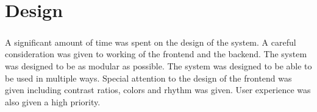 \chapter{Design}

    \paragraph*{}
        A significant amount of time was spent on the design of the system.
        A careful consideration was given to working of the frontend and the backend. The system was designed to be as modular as possible.
        The system was designed to be able to be used in multiple ways.
        Special attention to the design of the frontend was given including contrast ratios, colors and rhythm was given. User experience was also given a high priority. 



